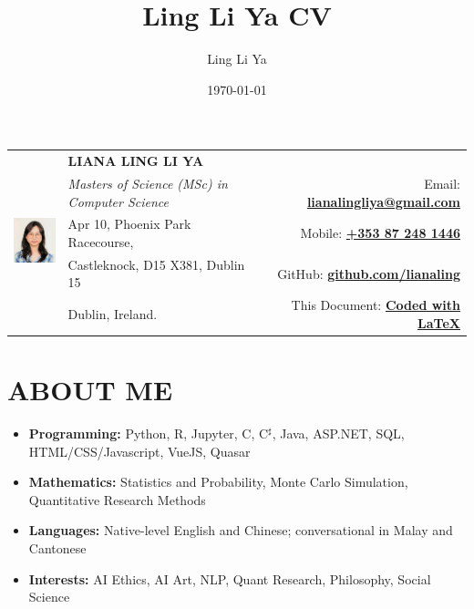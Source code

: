 \documentclass[a4paper,11pt]{article}
\title{Ling Li Ya CV}
\author{Ling Li Ya}
\date{\today}
\newcommand{\resumeItem}[2]{
  \item\small{
    {#1}{#2 \vspace{-2pt}}
  }
}
\newcommand{\resumeSubItem}[2]{\resumeItem{#1}{#2}\vspace{-4pt}}
\newcommand{\resumeSubHeadingListStart}{\begin{itemize}[leftmargin=*]}
\newcommand{\resumeSubHeadingListEnd}{\end{itemize}}
\newcommand{\CC}{C\nolinebreak\hspace{-.05em}\raisebox{.4ex}{\tiny\bf +}\nolinebreak\hspace{-.10em}\raisebox{.4ex}{\tiny\bf +}}
\def\CC{{C\nolinebreak[4]\hspace{-.05em}\raisebox{.4ex}{\tiny\bf ++}}}
\newcommand{\mytextsharp}{$^\sharp$}
\begin{document}
\begin{tabular*}{\textwidth\footnotesize}{ll @{\extracolsep{\fill}}r}
  \multirow{5}{*}{
    \begin{minipage}[l][2.0cm][c]{2.25cm}
      \includegraphics[width=2.0cm]{../profile-pic.jpg}
    \end{minipage}}  & {\textbf{\Large LIANA LING LI YA}} & \\
  & {\textit{Masters of Science (MSc) in Computer Science}} & {Email: \textbf{\href{mailto:lianalingliya@gmail.com}{lianalingliya@gmail.com}}} \\
  & {Apr 10, Phoenix Park Racecourse}, & {Mobile: \textbf{\href{tel:+60172801215}{+353 87 248 1446}}} \\
  & {Castleknock, D15 X381, Dublin 15} & {GitHub: \textbf{\href{http://github.com/lianaling/}{github.com/lianaling}}}\\
  & {Dublin, Ireland.} & {This Document: \textbf{\href{https://github.com/lianaling/resume/}{Coded with \LaTeX}}} \\
\end{tabular*}

\section{ABOUT ME}
\resumeSubHeadingListStart
\resumeSubItem{\textbf{Programming: }}{Python, R, Jupyter, \CC, C\mytextsharp, Java, ASP.NET, SQL, HTML/CSS/Javascript, VueJS, Quasar}
\resumeSubItem{\textbf{Mathematics: }}{Statistics and Probability, Monte Carlo Simulation, Quantitative Research Methods}
\resumeSubItem{\textbf{Languages: }}{Native-level English and Chinese; conversational in Malay and Cantonese}
\resumeSubItem{\textbf{Interests: }}{AI Ethics, AI Art, NLP, Quant Research, Philosophy, Social Science}
\resumeSubHeadingListEnd

\end{document}
